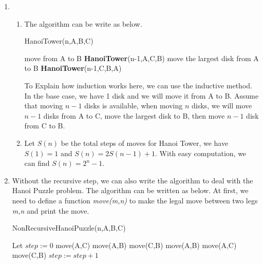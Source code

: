 \documentclass[a4paper,12pt]{article}
\begin{document}
\begin{enumerate}
\item{
\begin{enumerate}
    \item {
The algorithm can be write as below.

\begin{algorithm}
	\caption{HanoiTower(n,A,B,C)} 
	\begin{algorithmic}[1]
	    \State move from A to B
	    \State \textbf{HanoiTower}(n-1,A,C,B)
	    \State move the largest disk from A to B
	    \State \textbf{HanoiTower}(n-1,C,B,A)
    \end{algorithmic} 
\end{algorithm}
To Explain how induction works here, we can use the inductive method. In the base case, we have 1 disk and we will move it from A to B. Assume that moving $n-1$ disks is available, when moving $n$ disks, we will move $n-1$ disks from A to C, move the largest disk to B, then move $n-1$ disk from C to B. 
    }
    \item {
Let $S(n)$ be the total steps of moves for Hanoi Tower, we have $S(1)=1$ and $S(n) = 2 S(n-1) + 1$. With easy computation, we can find $S(n) = 2^n - 1$.
    
    }
\end{enumerate}

}
\newpage
\item{
Without the recursive step, we can also write the algorithm to deal with the Hanoi Puzzle problem. The algorithm can be written as below. At first, we need to define a function \textit{move(m,n)} to make the legal move between two legs \textit{m,n} and print the move.
\begin{algorithm}
	\caption{NonRecursiveHanoiPuzzle(n,A,B,C)} 
	\begin{algorithmic}[1]
	\State Let $step := 0$
	        \State move(A,C)
	        \State move(A,B)
	        \State move(C,B)
	   \Else
	        \State move(A,B)
	        \State move(A,C)
	        \State move(C,B)
	   \EndIf
	   \State $step := step + 1$
	   \EndWhile
\end{algorithmic} 
\end{algorithm}
}

\end{enumerate}
\end{document}

